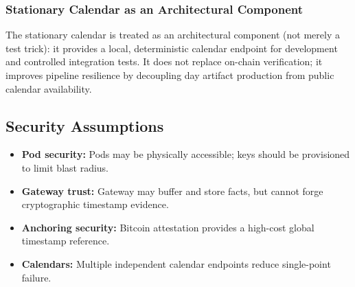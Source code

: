 \subsubsection{Stationary Calendar as an Architectural Component}
The stationary calendar is treated as an architectural component (not merely a test trick): it provides a local, deterministic calendar endpoint for development and controlled integration tests.
It does not replace on-chain verification; it improves pipeline resilience by decoupling day artifact production from public calendar availability.


\label{subsec:embedded-validation-architecture5}\label{subsec:embedded-validation-architecture}\label{subsec:embedded-validation-architecture4}\label{subsec:embedded-validation-architecture3}\label{subsec:embedded-validation-architecture2}\label{subsubsec:embedded-validation-architecture}

\subsection{Security Assumptions}\label{subsec:security-assumptions}
\begin{itemize}[nosep]
\item \textbf{Pod security:} Pods may be physically accessible; keys should be provisioned to limit blast radius.
\item \textbf{Gateway trust:} Gateway may buffer and store facts, but cannot forge cryptographic timestamp evidence.
\item \textbf{Anchoring security:} Bitcoin attestation provides a high-cost global timestamp reference.
\item \textbf{Calendars:} Multiple independent calendar endpoints reduce single-point failure.
\end{itemize}

